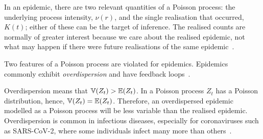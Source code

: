\documentclass[thesis.tex]{subfiles}
\begin{document}
In an epidemic, there are two relevant quantities of a Poisson process: the underlying process intensity, $\nu(r)$, and the single realisation that occurred, $K(t)$; either of these can be the target of inference.
The realised counts are normally of greater interest because we care about the realised epidemic, not what may happen if there were future realisations of the same epidemic~\autocite{beckerDependent,brookmeyerMethod}.

Two features of a Poisson process are violated for epidemics.
Epidemics commonly exhibit \emph{overdispersion} and have feedback loops~\autocite{beckerDependent}.

Overdispersion means that $\operatorname{\mathbb{V}}(Z_t) > \operatorname{\mathbb{E}}(Z_t)$.
In a Poisson process $Z_t$ has a Poisson distribution, hence, $\operatorname{\mathbb{V}}(Z_t) = \operatorname{\mathbb{E}}(Z_t)$.
Therefore, an overdispersed epidemic modelled as a Poisson process will be less variable than the realised epidemic.
Overdispersion is common in infectious diseases, especially for coronaviruses such as SARS-CoV-2, where some individuals infect many more than others~\autocite{endoEstimating,adamClustering,mccloskeySARS}.

\end{document}
